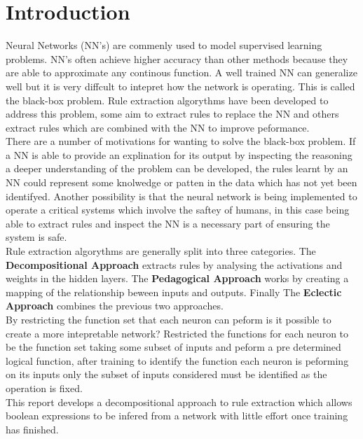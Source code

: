 \chapter{Introduction}\label{C:intro}
Neural Networks (NN's) are commenly used to model supervised learning problems. NN's often achieve higher accuracy than other methods because they are able to approximate any continous function. A well trained NN can generalize well but it is very diffcult to intepret how the network is operating. This is called the black-box problem. Rule extraction algorythms have been developed to address this problem, some aim to extract rules to replace the NN and others extract rules which are combined with the NN to improve peformance.\\

There are a number of motivations for wanting to solve the black-box problem. If a NN is able to provide an explination for its output by inspecting the reasoning a deeper understanding of the problem can be developed, the rules learnt by an NN could represent some knolwedge or patten in the data which has not yet been identifyed. Another possibility is that the neural network is being implemented to operate a critical systems which involve the saftey of humans, in this case being able to extract rules and inspect the NN is a necessary part of ensuring the system is safe.\\

Rule extraction algorythms are generally split into three categories. The \textbf{Decompositional Approach} extracts rules by analysing the activations and weights in the hidden layers. The \textbf{Pedagogical Approach} works by creating a mapping of the relationship beween inputs and outputs. Finally The \textbf{Eclectic Approach} combines the previous two approaches.\\

By restricting the function set that each neuron can peform is it possible to create a more intepretable network? Restricted the functions for each neuron to be the function set taking some subset of inputs and peform a pre determined logical function, after training to identify the function each neuron is peforming on its inputs only the subset of inputs considered must be identified as the operation is fixed.\\

This report develops a decompositional approach to rule extraction which allows boolean expressions to be infered from a network with little effort once training has finished.\\

